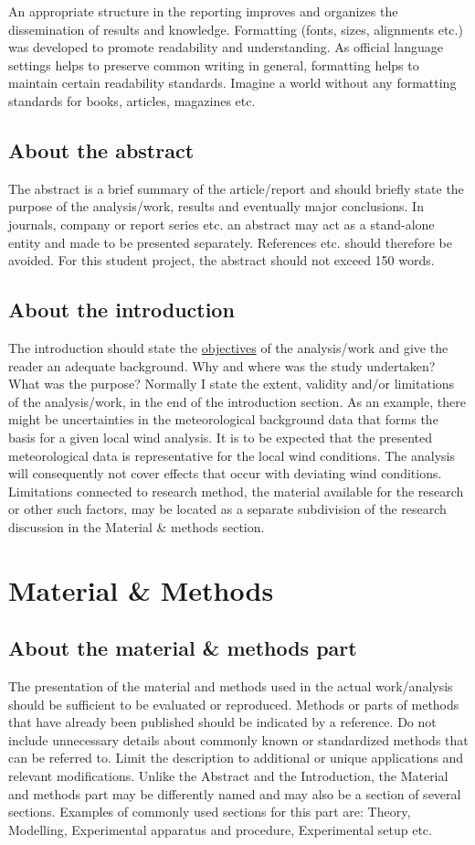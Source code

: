 \documentclass[a4paper,11pt]{extarticle}
\begin{document}
An appropriate structure in the reporting improves and organizes the dissemination of results and knowledge. Formatting (fonts, sizes, alignments etc.) was developed to promote readability and understanding. As official language settings helps to preserve common writing in general, formatting helps to maintain certain readability standards. Imagine a world without any formatting standards for books, articles, magazines etc.

\subsection{About the abstract}
The abstract is a brief summary of the article/report and should briefly state the purpose of the analysis/work, results and eventually major conclusions. In journals, company or report series etc. an abstract may act as a stand-alone entity and made to be presented separately. References etc. should therefore be avoided. For this student project, the abstract should not exceed 150 words.

\subsection{About the introduction}
The introduction should state the \ul{objectives} of the analysis/work and give the reader an adequate background. Why and where was the study undertaken? What was the purpose? Normally I state the extent, validity and/or limitations of the analysis/work, in the end of the introduction section. As an example, there might be uncertainties in the meteorological background data that forms the basis for a given local wind analysis. It is to be expected that the presented meteorological data is representative for the local wind conditions. The analysis will consequently not cover effects that occur with deviating wind conditions. Limitations connected to research method, the material available for the research or other such factors, may be located as a separate subdivision of the research discussion in the Material \& methods section.

\section{Material \& Methods}
\subsection{About the material \& methods part}
The presentation of the material and methods used in the actual work/analysis should be sufficient to be evaluated or reproduced. Methods or parts of methods that have already been published should be indicated by a reference. Do not include unnecessary details about commonly known or standardized methods that can be referred to. Limit the description to additional or unique applications and relevant modifications. Unlike the Abstract and the Introduction, the Material and methods part may be differently named and may also be a section of several sections. Examples of commonly used sections for this part are: Theory, Modelling, Experimental apparatus and procedure, Experimental setup etc.
\end{document}

